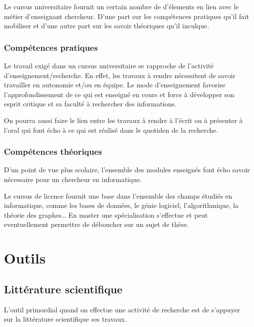 \documentclass[14pt, a4paper]{report}
\begin{document}
  	Le cursus universitaire fournit un certain nombre de d'élements en lien avec le métier d'enseignant chercheur. D'une part sur les compétences pratiques qu'il fait mobiliser et d'une autre part sur les savoir théoriques qu'il inculque.

    \subsection{Compétences pratiques}


    Le travail exigé dans un cursus universitaire se rapproche de l'activité d'enseignement/recherche. En effet, les travaux à rendre nécessitent de savoir travailler en autonomie et/ou en équipe.
    Le mode d'enseignement favorise l'approfondissement de ce qui est enseigné en cours et force à développer son esprit critique et sa faculté à rechercher des informations.

    On pourra aussi faire le lien entre les travaux à rendre à l'écrit ou à présenter à l'oral qui font écho à ce qui est réalisé dans le quotiden de la recherche.

    \subsection{Compétences théoriques}

    D'un point de vue plus scolaire, l'ensemble des modules enseignés font écho savoir nécessaire pour un chercheur en informatique.

    Le cursus de licence fournit une base dans l'ensemble des champs étudiés en informatique, comme les bases de données, le génie logiciel, l'algorithmique, la théorie des graphes\dots
    En master une spécialisation s'effectue et peut eventuellement permettre de déboucher sur un sujet de thèse.

\chapter{Outils}

  \section{Littérature scientifique}

  L'outil primordial quand on effectue une activité de recherche est de s'appuyer sur la littérature scientifique ses travaux.
  
\end{document}
